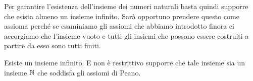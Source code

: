 Per garantire l'esistenza dell'insieme dei numeri naturali basta quindi 
supporre che esista almeno un insieme infinito.
Sarà opportuno prendere questo come assioma perché se esaminiamo 
gli assiomi che abbiamo introdotto finora 
ci accorgiamo che l'insieme vuoto e tutti gli insiemi che possono 
essere costruiti a partire da esso sono tutti finiti.

\begin{axiom}[infinito]
\label{axiom:infinito}%
Esiste un insieme infinito. 
E non è restrittivo supporre che tale insieme sia un insieme ${\mathbb N}$ 
che soddisfa gli assiomi di Peano. 
\end{axiom}

  
